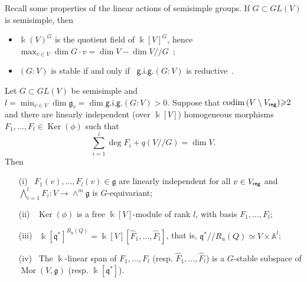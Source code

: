 \noindent
Recall some properties of the linear actions of semisimple groups. If $G\subset GL(V)$ is semisimple, then
\begin{itemize}
\item ${\Bbbk}(V)^G$ is the quotient field of ${\Bbbk}[V]^G$, hence
    $\max_{v\in V} \dim G{\cdot}v=\dim V-\dim V{/\!\!/} G$~\cite{VP};
\item $(G:V)$ is stable if and only if \ ${\mathsf{g.i.g.}}(G:V)$ is reductive~\cite[Theorem\,7.15]{VP}.
\end{itemize}

\begin{thm}   \label{thm:main1}
Let $G\subset GL(V)$ be semisimple and  $l=\min_{v\in V}\dim{{\mathfrak g}}_v=\dim {\mathsf{g.i.g.}}(G:V)>0$.
Suppose that ${{\mathrm{codim\,}}}(V\setminus V_{\sf reg}){\geqslant} 2$ and there are linearly independent 
(over ${\Bbbk}[V]$) homogeneous morphisms $F_1,\dots,F_l\in{\operatorname{Ker}}(\phi)$ such that
\begin{equation}   \label{eq:summa}
   \textstyle \sum_{i=1}^l \deg F_i  + q(V{/\!\!/} G)=\dim V .
\end{equation}
Then 
\begin{itemize}
\item[\sf (i)] \  $F_1(v),\dots, F_l(v)\in {{\mathfrak g}}$ are linearly independent for all $v\in V_{\sf reg}$ 
and $\bigwedge_{i=1}^l F_i: V\to \wedge^m{{\mathfrak g}}$ is $G$-equivariant;
\item[\sf (ii)] \  ${\operatorname{Ker}}(\phi)$ is a free ${\Bbbk}[V]$-module of rank $l$, with basis $F_1,\dots,F_l$;
\item[\sf (iii)] \ ${\Bbbk}[{{\mathfrak q}}^*]^{R_u(Q)}={\Bbbk}[V][\hat F_1,\dots,\hat F_l]$, that is,
${{\mathfrak q}}^*{/\!\!/} {R_u(Q)}\simeq V\times \mathbb A^l$;
\item[\sf (iv)] \ The ${\Bbbk}$-linear span of $F_1,\dots,F_l$ (resp. $\hat F_1,\dots,\hat F_l$)  is a $G$-stable subspace of\/ ${\operatorname{Mor}}(V,{{\mathfrak g}})$ (resp. ${\Bbbk}[{{\mathfrak q}}^*]$).
\end{itemize}
\end{thm}
